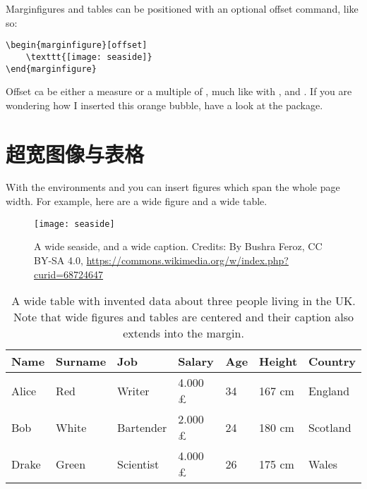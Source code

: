 Marginfigures and tables can be positioned with an optional offset
command, like so:

\begin{lstlisting}
\begin{marginfigure}[offset]
	\texttt{[image: seaside]}
\end{marginfigure}
\end{lstlisting}

Offset ca be either a measure or a multiple of ,
much like with ,  and
. If you are wondering how I
inserted this orange bubble, have a look at the  package.

\section{超宽图像与表格}

With the environments  and  you
can insert figures which span the whole page width. For example, here
are a wide figure and a wide table.

\begin{figure*}[h!]
	\texttt{[image: seaside]}
	\caption[A wide seaside]{A wide seaside, and a wide caption.
		Credits: By Bushra Feroz, CC BY-SA 4.0, \url{https://commons.wikimedia.org/w/index.php?curid=68724647}}
\end{figure*}

\begin{table*}[h!]
    \caption{A wide table with invented data about three people living in the UK. Note that wide figures and tables are centered and their caption also extends into the margin.}
    \begin{tabular}{p{2.0cm} p{2.0cm} p{2.0cm} p{2.0cm} p{2.0cm} p{2.0cm} p{1.5cm}}
        \toprule
        Name    & Surname   & Job       & Salary           & Age   & Height    & Country \\
        \midrule
        Alice   & Red       & Writer    & 4.000 \pounds    & 34    & 167 cm     & England \\
        Bob     & White     & Bartender & 2.000 \pounds    & 24    & 180 cm     & Scotland \\
        Drake   & Green     & Scientist & 4.000 \pounds    & 26    & 175 cm     & Wales \\
        \bottomrule
    \end{tabular}
\end{table*}

